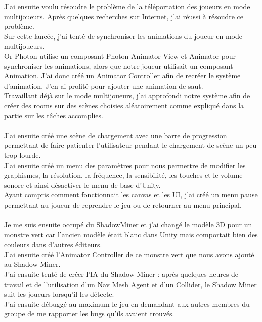 \documentclass[titlepage, 13px, a4paper]{report}
\begin{document}
J’ai ensuite voulu résoudre le problème de la téléportation des joueurs en mode multijoueurs. 
Après quelques recherches sur Internet, j’ai réussi à résoudre ce problème. \\
Sur cette lancée, j’ai tenté de synchroniser les animations du joueur en mode multijoueurs. \\
Or Photon utilise un composant Photon Animator View et Animator pour synchroniser les animations, alors que notre joueur utilisait un composant Animation. 
J’ai donc créé un Animator Controller afin de recréer le système d’animation. J’en ai profité pour ajouter une animation de saut. \\
Travaillant déjà sur le mode multijoueurs, j’ai approfondi notre système afin de créer 
des rooms sur des scènes choisies aléatoirement comme expliqué dans la partie sur les tâches accomplies. \\ \\


J’ai ensuite créé une scène de chargement avec une barre de progression permettant de faire patienter 
l’utilisateur pendant le chargement de scène un peu trop lourde. \\
J’ai ensuite créé un menu des paramètres pour nous permettre de modifier les graphismes, la résolution, 
la fréquence, la sensibilité, les touches et le volume sonore et ainsi désactiver le menu de base d'Unity. \\
Ayant compris comment fonctionnait les canvas et les UI, j’ai créé un menu pause permettant au joueur 
de reprendre le jeu ou de retourner au menu principal. \\ \\


Je me suis ensuite occupé du ShadowMiner et j'ai changé le modèle 3D pour un monstre vert car l’ancien modèle 
était blanc dans Unity mais comportait bien des couleurs dans d’autres éditeurs. \\
J’ai ensuite créé l’Animator Controller de ce monstre vert que nous avons ajouté au Shadow Miner. \\
J’ai ensuite tenté de créer l’IA du Shadow Miner : après quelques heures de travail et de l’utilisation d’un Nav Mesh Agent 
et d’un Collider, le Shadow Miner suit les joueurs lorsqu’il les détecte. \\
J’ai ensuite débuggé au maximum le jeu en demandant aux autres membres du groupe de me rapporter les bugs qu’ils avaient trouvés. \\ \\
\end{document}
